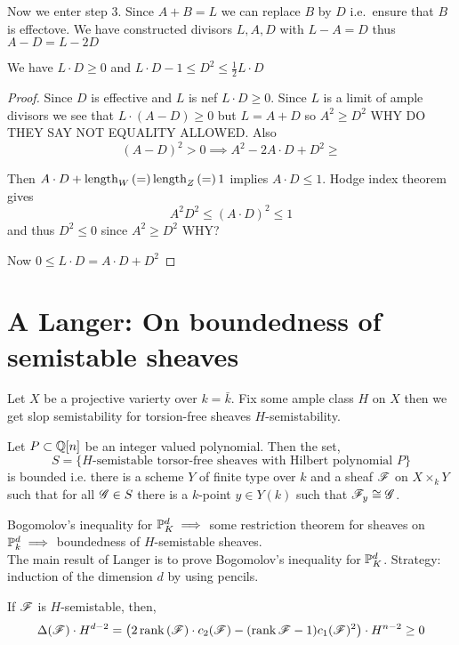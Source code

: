 \documentclass[12pt]{article}
\begin{document}
Now we enter step 3. Since $A + B = L$ we can replace $B$ by $D$ i.e.\ ensure that $B$ is effectove. We have constructed divisors $L, A, D$ with $L - A = D$ thus $A - D = L - 2 D$

\begin{lemma}
We have $L \cdot D \ge 0$ and $L \cdot D - 1 \le D^2 \le \frac{1}{2} L \cdot D$ 
\end{lemma}

\begin{proof}
Since $D$ is effective and $L$ is nef $L \cdot D \ge 0$. Since $L$ is a limit of ample divisors we see that $L \cdot (A - D) \ge 0$ but $ L = A + D$ so $A^2 \ge D^2$ {\color{red} WHY DO THEY SAY NOT EQUALITY ALLOWED}. Also 
\[ (A - D)^2 > 0 \implies A^2 - 2 A \cdot D + D^2 \ge \]

Then $A \cdot D + \length{W} = \length{Z} = 1$ implies $A \cdot D \le 1$. 
Hodge index theorem gives
\[ A^2 D^2 \le (A \cdot D)^2 \le 1 \]
and thus $D^2 \le 0$ since $A^2 \ge D^2$ {\color{red} WHY?}

Now $0 \le L \cdot D = A \cdot D + D^2$
\end{proof}

\section{A Langer: On boundedness of semistable sheaves}

Let $X$ be a projective varierty over $k = \bar{k}$. Fix some ample class $H$ on $X$ then we get slop semistability for torsion-free sheaves $H$-semistability.

\begin{theorem}[Boundedness]
Let $P \subset \Q[n]$ be an integer valued polynomial. Then the set,
\[ S = \{ H\text{-semistable torsor-free sheaves with Hilbert polynomial } P \} \]
is bounded i.e. there is a scheme $Y$ of finite type over $k$ and a sheaf $\F$ on $X \times_k Y$ such that for all $\G \in S$ there is a $k$-point $y \in Y(k)$ such that $\F_y \cong \G$. 
\end{theorem}

Bogomolov's inequality for $\P^d_K \implies$ some restriction theorem for sheaves on $\P^d_k \implies$ boundedness of $H$-semistable sheaves. 
\bigskip\\
The main result of Langer is to prove Bogomolov's inequality for $\P^d_K$. Strategy: induction of the dimension $d$ by using pencils. 

\begin{theorem}
If $\F$ is $H$-semistable, then,
\[ \Delta(\F) \cdot H^{d-2} = \left(2 \rank{(\F)} \cdot c_2(\F) - (\rank{\F} - 1) c_1(\F)^2 \right) \cdot H^{n-2} \ge 0 \] 
\end{theorem}
\end{document}
